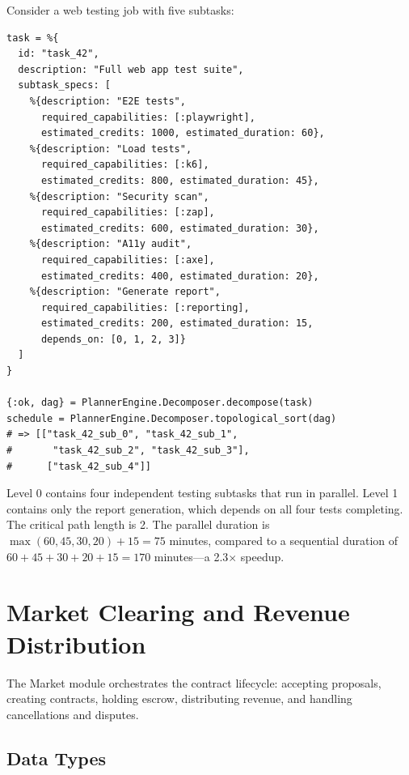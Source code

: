 \documentclass[12pt,a4paper]{article}
\theoremstyle{plain}
\theoremstyle{definition}
\begin{document}
Consider a web testing job with five subtasks:

\begin{lstlisting}[caption={Example task decomposition},label={lst:decomp-example}]
task = %{
  id: "task_42",
  description: "Full web app test suite",
  subtask_specs: [
    %{description: "E2E tests",
      required_capabilities: [:playwright],
      estimated_credits: 1000, estimated_duration: 60},
    %{description: "Load tests",
      required_capabilities: [:k6],
      estimated_credits: 800, estimated_duration: 45},
    %{description: "Security scan",
      required_capabilities: [:zap],
      estimated_credits: 600, estimated_duration: 30},
    %{description: "A11y audit",
      required_capabilities: [:axe],
      estimated_credits: 400, estimated_duration: 20},
    %{description: "Generate report",
      required_capabilities: [:reporting],
      estimated_credits: 200, estimated_duration: 15,
      depends_on: [0, 1, 2, 3]}
  ]
}

{:ok, dag} = PlannerEngine.Decomposer.decompose(task)
schedule = PlannerEngine.Decomposer.topological_sort(dag)
# => [["task_42_sub_0", "task_42_sub_1",
#       "task_42_sub_2", "task_42_sub_3"],
#      ["task_42_sub_4"]]
\end{lstlisting}

Level 0 contains four independent testing subtasks that run in parallel. Level 1 contains only the report generation, which depends on all four tests completing. The critical path length is 2. The parallel duration is $\max(60, 45, 30, 20) + 15 = 75$ minutes, compared to a sequential duration of $60 + 45 + 30 + 20 + 15 = 170$ minutes---a 2.3$\times$ speedup.

\section{Market Clearing and Revenue Distribution}\label{sec:market}

The Market module orchestrates the contract lifecycle: accepting proposals, creating contracts, holding escrow, distributing revenue, and handling cancellations and disputes.

\subsection{Data Types}
\end{document}
